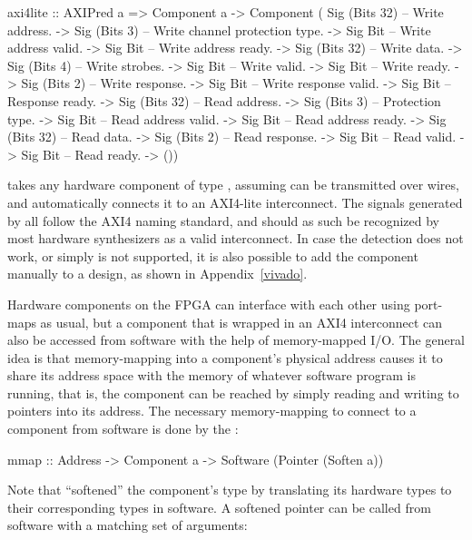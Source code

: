 \documentclass[../paper.tex]{subfiles}
\begin{document}
\begin{code}
axi4lite :: AXIPred a
  => Component a
  -> Component (
          Sig (Bits 32) -- Write address.
       -> Sig (Bits 3)  -- Write channel protection type.
       -> Sig Bit       -- Write address valid.
       -> Sig Bit       -- Write address ready.
       -> Sig (Bits 32) -- Write data.
       -> Sig (Bits 4)  -- Write strobes.
       -> Sig Bit       -- Write valid.
       -> Sig Bit       -- Write ready.
       -> Sig (Bits 2)  -- Write response.
       -> Sig Bit       -- Write response valid.
       -> Sig Bit       -- Response ready.
       -> Sig (Bits 32) -- Read address.
       -> Sig (Bits 3)  -- Protection type.
       -> Sig Bit       -- Read address valid.
       -> Sig Bit       -- Read address ready.
       -> Sig (Bits 32) -- Read data.
       -> Sig (Bits 2)  -- Read response.
       -> Sig Bit       -- Read valid.
       -> Sig Bit       -- Read ready.    
       -> ())
\end{code}

 takes any hardware component of type , assuming  can be transmitted over wires, and automatically connects it to an AXI4-lite interconnect. The signals generated by  all follow the AXI4 naming standard, and should as such be recognized by most hardware synthesizers as a valid interconnect. In case the detection does not work, or simply is not supported, it is also possible to add the component manually to a design, as shown in Appendix~\ref{vivado}.

Hardware components on the FPGA can interface with each other using port-maps as usual, but a component that is wrapped in an AXI4 interconnect can also be accessed from software with the help of memory-mapped I/O. The general idea is that memory-mapping into a component's physical address causes it to share its address space with the memory of whatever software program is running, that is, the component can be reached by simply reading and writing to pointers into its address. The necessary memory-mapping to connect to a component from software is done by the :

\begin{code}
mmap :: Address -> Component a -> Software (Pointer (Soften a))
\end{code}

\noindent Note that  ``softened'' the component's type by translating its hardware types to their corresponding types in software. A softened pointer can be called from software with a matching set of arguments:
\end{document}
